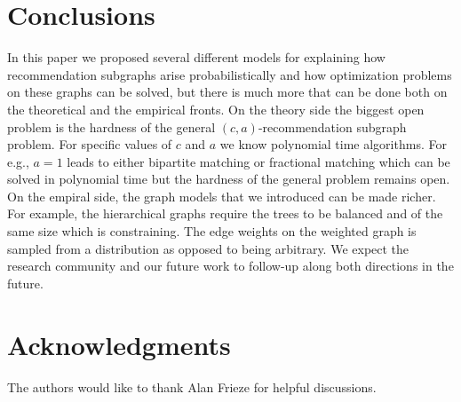\section{Conclusions}

In this paper we proposed several different models for explaining how
recommendation subgraphs arise probabilistically and how optimization
problems on these graphs can be solved, but there is much more that
can be done both on the theoretical and the empirical fronts. On the
theory side the biggest open problem is the hardness of the general
$(c, a)$-recommendation subgraph problem. For specific values of $c$
and $a$ we know polynomial time algorithms. For e.g., $a=1$ leads to
either bipartite matching or fractional matching which can be solved
in polynomial time but the hardness of the general problem remains
open. On the empiral side, the graph models that we introduced can be
made richer. For example, the hierarchical graphs require the trees to
be balanced and of the same size which is constraining. The edge
weights on the weighted graph is sampled from a distribution as
opposed to being arbitrary. We expect the research community and our
future work to follow-up along both directions in the future.

\section{Acknowledgments}

The authors would like to thank Alan Frieze for helpful discussions.






